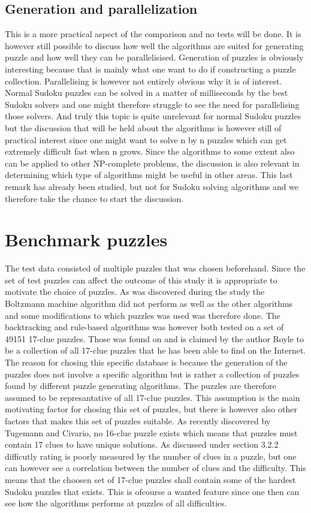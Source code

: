 \documentclass[a4paper,11pt]{kth-mag}
\begin{document}
\subsection{Generation and parallelization}
This is a more practical aspect of the comparison and no tests will be done. It is however still possible to discuss how well the algorithms are suited for generating puzzle and how well they can be parallelisised. Generation of puzzles is obviously interesting because that is mainly what one want to do if constructing a puzzle collection. Parallelising is however not entirely obvious why it is of interest. Normal Sudoku puzzles can be solved in a matter of milliseconds by the best Sudoku solvers and one might therefore struggle to see the need for parallelising those solvers. And truly this topic is quite unrelevant for normal Sudoku puzzles but the discussion that will be held about the algorithms is however still of practical interest since one might want to solve n by n puzzles which can get extremely difficult fast when n grows. Since the algorithms to some extent also can be applied to other NP-complete problems, the discussion is also relevant in determining which type of algorithms might be useful in other areas. This last remark has already been studied, but not for Sudoku solving algorithms and we therefore take the chance to start the discussion.

\section{Benchmark puzzles}
The test data consisted of multiple puzzles that was chosen beforehand.
Since the set of test puzzles can affect the outcome of this study it is appropriate to motivate the choice of puzzles.
As was discovered during the study the Boltzmann machine algorithm did not perform as well as the other algorithms and some modifications to which puzzles was used was therefore done.
The backtracking and rule-based algorithms was however both tested on a set of 49151 17-clue puzzles. 
Those was found on \cite{database} and is claimed by the author Royle to be a collection of all 17-clue puzzles that he has been able to find on the Internet. 
The reason for chosing this specific database is because the generation of the puzzles does not involve a specific algorithm but is rather a collection of puzzles found by different puzzle generating algorithms.  
The puzzles are therefore assumed to be represantative of all 17-clue puzzles. 
This assumption is the main motivating factor for chosing this set of puzzles, but there is however also other factors that makes this set of puzzles suitable. 
As recently discovered by Tugemann and Civario, no 16-clue puzzle exists which means that puzzles must contain 17 clues to have unique solutions. \cite{17clueProof}  
As discussed under section 3.2.2 difficutly rating is poorly measured by the number of clues in a puzzle, but one can however see a correlation between the number of clues and the difficulty. \cite{difficulty}
This means that the choosen set of 17-clue puzzles shall contain some of the hardest Sudoku puzzles that exists.
This is ofcourse a wanted feature since one then can see how the algorithms performs at puzzles of all difficulties.
\end{document}
